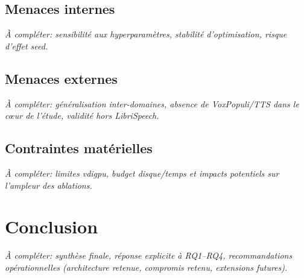\documentclass[11pt,a4paper]{article}
\begin{document}
\subsection{Menaces internes}
\textit{À compléter: sensibilité aux hyperparamètres, stabilité d'optimisation, risque d'effet seed.}

\subsection{Menaces externes}
\textit{À compléter: généralisation inter-domaines, absence de VoxPopuli/TTS dans le cœur de l'étude, validité hors LibriSpeech.}

\subsection{Contraintes matérielles}
\textit{À compléter: limites vdigpu, budget disque/temps et impacts potentiels sur l'ampleur des ablations.}

\section{Conclusion}
\textit{À compléter: synthèse finale, réponse explicite à RQ1--RQ4, recommandations opérationnelles (architecture retenue, compromis retenu, extensions futures).}
\end{document}
